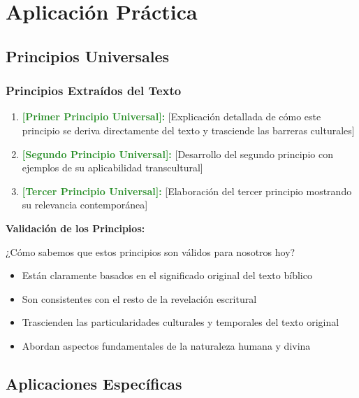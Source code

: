 \documentclass[12pt,a4paper]{article}
\newcommand{\principio}[1]{\textcolor{forestgreen}{\textbf{#1}}}
\begin{document}
\section{Aplicación Práctica}

\subsection{Principios Universales}

\subsubsection{Principios Extraídos del Texto}

\begin{enumerate}[leftmargin=*]
    \item \principio{[Primer Principio Universal]:} [Explicación detallada de cómo este principio se deriva directamente del texto y trasciende las barreras culturales]
    \item \principio{[Segundo Principio Universal]:} [Desarrollo del segundo principio con ejemplos de su aplicabilidad transcultural]
    \item \principio{[Tercer Principio Universal]:} [Elaboración del tercer principio mostrando su relevancia contemporánea]
\end{enumerate}

\begin{mdframed}[style=InfoBox]
\textbf{Validación de los Principios:}

¿Cómo sabemos que estos principios son válidos para nosotros hoy?
\begin{itemize}[leftmargin=*]
    \item Están claramente basados en el significado original del texto bíblico
    \item Son consistentes con el resto de la revelación escritural
    \item Trascienden las particularidades culturales y temporales del texto original
    \item Abordan aspectos fundamentales de la naturaleza humana y divina
\end{itemize}
\end{mdframed}

\subsection{Aplicaciones Específicas}
\end{document}
